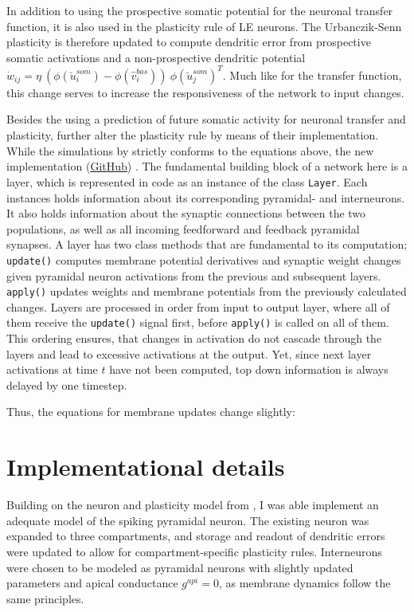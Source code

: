 In addition to using the prospective somatic potential for the neuronal transfer function, it is also used in the
plasticity rule of LE neurons. The Urbanczik-Senn plasticity is therefore updated to compute dendritic error from
prospective somatic activations and a non-prospective dendritic potential $\dot{w}_{ij}= \eta \ (
\phi(\breve{u}_i^{som}) - \phi(\hat{v}_i^{bas}) ) \ \phi(\breve{u}_j^{som})^T$. Much like for the transfer function,
this change serves to increase the responsiveness of the network to input changes. \newline


Besides the using a prediction of future somatic activity for neuronal transfer and plasticity, \cite{Haider2021}
further alter the plasticity rule by means of their implementation. While the simulations by
\cite{sacramento2018dendritic} strictly conforms to the equations above, the new implementation
(\href{https://github.com/neurips}{GitHub}) . The fundamental building block of a network here is a layer, which is
represented in code as an instance of the class \texttt{Layer}. Each instances holds information about its corresponding
pyramidal- and interneurons. It also holds information about the synaptic connections between the two populations, as
well as all incoming feedforward and feedback pyramidal synapses. A layer has two class methods that are fundamental to
its computation; \texttt{update()} computes membrane potential derivatives and synaptic weight changes given pyramidal
neuron activations from the previous and subsequent layers. \texttt{apply()} updates weights and membrane potentials
from the previously calculated changes. Layers are processed in order from input to output layer, where all of them
receive the \texttt{update()} signal first, before \texttt{apply()} is called on all of them. This ordering ensures,
that changes in activation do not cascade through the layers and lead to excessive activations at the output. Yet, since
next layer activations at time $t$ have not been computed, top down information is always delayed by one timestep.


Thus, the equations for membrane updates change slightly:

\section{Implementational details}

Building on the neuron and plasticity model from \cite{Stapmanns2021}, I was able implement an adequate model of the
spiking pyramidal neuron. The existing neuron was expanded to three compartments, and storage and readout of dendritic
errors were updated  to allow for compartment-specific plasticity rules. Interneurons were chosen to be modeled as
pyramidal neurons with slightly updated parameters and apical conductance $g^{api}=0$, as membrane dynamics follow 
the same principles.  

